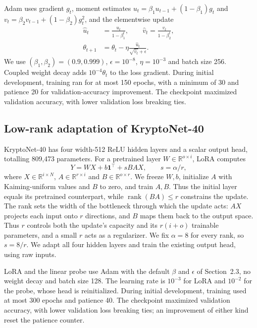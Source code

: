 \documentclass{article}
\begin{document}
Adam \cite{kingma2015} uses gradient $g_t$, moment estimates $u_t=\beta_1u_{t-1}+(1-\beta_1)g_t$ and $v_t=\beta_2v_{t-1}+(1-\beta_2)g_t^2$, and the elementwise update
\begin{align}
\hat u_t&=\frac{u_t}{1-\beta_1^t},\qquad \hat v_t=\frac{v_t}{1-\beta_2^t},\nonumber\\
\theta_{t+1}&=\theta_t-\eta\frac{\hat u_t}{\sqrt{\hat v_t}+\epsilon}.
\end{align}
We use $(\beta_1,\beta_2)=(0.9,0.999)$, $\epsilon=10^{-8}$, $\eta=10^{-3}$ and batch size 256. Coupled weight decay adds $10^{-4}\theta_t$ to the loss gradient. During initial development, training ran for at most 150 epochs, with a minimum of 30 and patience 20 for validation-accuracy improvement. The checkpoint maximized validation accuracy, with lower validation loss breaking ties.

\subsection{Low-rank adaptation of KryptoNet-40}
KryptoNet-40 has four width-512 ReLU hidden layers and a scalar output head, totalling 809,473 parameters. For a pretrained layer $W\in\mathbb R^{o\times i}$, LoRA \cite{hu2022} computes
\begin{equation}
Y=WX+b\mathbf1^\top+sBAX,\qquad s=\alpha/r,
\label{eq:lora}
\end{equation}
where $X\in\mathbb R^{i\times N}$, $A\in\mathbb R^{r\times i}$ and $B\in\mathbb R^{o\times r}$. We freeze $W,b$, initialize $A$ with Kaiming-uniform values and $B$ to zero, and train $A,B$. Thus the initial layer equals its pretrained counterpart, while $\operatorname{rank}(BA)\leq r$ constrains the update. The rank sets the width of the bottleneck through which the update acts: $AX$ projects each input onto $r$ directions, and $B$ maps them back to the output space. Thus $r$ controls both the update's capacity and its $r(i+o)$ trainable parameters, and a small $r$ acts as a regularizer. We fix $\alpha=8$ for every rank, so $s=8/r$. We adapt all four hidden layers and train the existing output head, using raw inputs.

LoRA and the linear probe use Adam with the default $\beta$ and $\epsilon$ of Section~2.3, no weight decay and batch size 128. The learning rate is $10^{-3}$ for LoRA and $10^{-2}$ for the probe, whose head is reinitialized. During initial development, training used at most 300 epochs and patience 40. The checkpoint maximized validation accuracy, with lower validation loss breaking ties; an improvement of either kind reset the patience counter.
\end{document}
